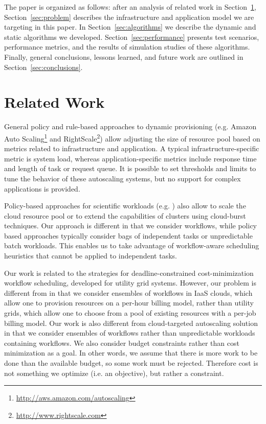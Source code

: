 \documentclass{sig-alternate}
\begin{document}
The paper is organized as follows: after an analysis of related work in
Section~\ref{sec:related}, Section~\ref{sec:problem} describes the
infrastructure and application model we are targeting in this paper.
In Section~\ref{sec:algorithms} we describe the dynamic and
static algorithms we developed. Section~\ref{sec:performance} presents test
scenarios, performance metrics, and the results of simulation studies of these algorithms.
Finally, general conclusions, lessons learned, and future work are outlined in
Section~\ref{sec:conclusions}.

\section{Related Work}
\label{sec:related}
General policy and rule-based approaches to dynamic provisioning (e.g. Amazon
Auto Scaling\footnote{\url{http://aws.amazon.com/autoscaling}} and
RightScale\footnote{\url{http://www.rightscale.com}}) allow adjusting the size
of resource pool based on metrics related to infrastructure and application.
A typical infrastruc\-ture-specific metric is system load, whereas
application-speci\-fic metrics include response time and length of task or
request queue. It is possible to set thresholds and limits to tune the behavior
of these autoscaling systems, but no support for complex applications is provided.

Policy-based approaches for scientific workloads (e.g. \cite{Marshall2010,
Kim2011}) also allow to scale the cloud resource pool or to extend the
capabilities of clusters using cloud-burst techniques. Our approach is different
in that we consider workflows, while policy based approaches typically consider
bags of independent tasks or unpredictable batch workloads. This enables us to
take advantage of workflow-aware scheduling heuristics that cannot be applied to
independent tasks.


Our work is related to the strategies for deadline-con\-strained
cost-minimization workflow scheduling, developed for utility grid systems. However, our problem is
different from \cite{Yu2005, Abrishami2010} in that we consider ensembles of workflows in
IaaS clouds, which allow one to provision resources on a per-hour billing model,
rather than utility grids, which allow one to choose from a pool of existing
resources with a per-job billing model. Our work is also different from
cloud-targeted autoscaling solution~\cite{Mao2011} in that we consider ensembles
of workflows rather than unpredictable workloads containing workflows. We also consider budget constraints
rather than cost minimization as a goal. In other words, we assume that there is
more work to be done than the available budget, so some work must be rejected.
Therefore cost is not something we optimize (i.e. an objective), but rather a constraint.
\end{document}
